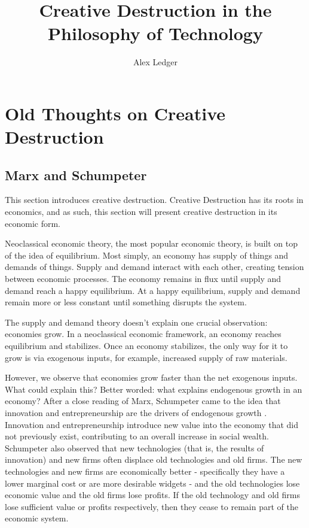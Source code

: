 \documentclass[11pt]{article}
\title{Creative Destruction in the Philosophy of Technology}
\author{Alex Ledger}
\date{}
\begin{document}
\maketitle

\section{Old Thoughts on Creative Destruction}
\subsection{Marx and Schumpeter}
This section introduces creative destruction.
Creative Destruction has its roots in economics, and as such, this section will present creative destruction in its economic form.

Neoclassical economic theory, the most popular economic theory, is built on top of the idea of equilibrium.
Most simply, an economy has supply of things and demands of things. 
Supply and demand interact with each other, creating tension between economic processes.
The economy remains in flux until supply and demand reach a happy equilibrium.
At a happy equilibrium, supply and demand remain more or less constant until something disrupts the system.

The supply and demand theory doesn't explain one crucial observation: economies grow.
In a neoclassical economic framework, an economy reaches equilibrium and stabilizes.
Once an economy stabilizes, the only way for it to grow is via exogenous inputs, for example, increased supply of raw materials.

However, we observe that economies grow faster than the net exogenous inputs.
What could explain this?
Better worded: what explains endogenous growth in an economy?
After a close reading of Marx, Schumpeter came to the idea that innovation and entrepreneurship are the drivers of endogenous growth \cite{jaffe}.
Innovation and entrepreneurship introduce new value into the economy that did not previously exist, contributing to an overall increase in social wealth.
Schumpeter also observed that new technologies (that is, the results of innovation)  and new firms often displace old technologies and old firms.
The new technologies and new firms are economically better - specifically they have a lower marginal cost or are more desirable widgets - and the old technologies lose economic value and the old firms lose profits.
If the old technology and old firms lose sufficient value or profits respectively, then they cease to remain part of the economic system.
\end{document}
